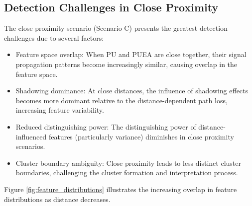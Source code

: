 \subsection{Detection Challenges in Close Proximity}

The close proximity scenario (Scenario C) presents the greatest detection challenges due to several factors:

\begin{itemize}
    \item Feature space overlap: When PU and PUEA are close together, their signal propagation patterns become increasingly similar, causing overlap in the feature space.
    
    \item Shadowing dominance: At close distances, the influence of shadowing effects becomes more dominant relative to the distance-dependent path loss, increasing feature variability.
    
    \item Reduced distinguishing power: The distinguishing power of distance-influenced features (particularly variance) diminishes in close proximity scenarios.
    
    \item Cluster boundary ambiguity: Close proximity leads to less distinct cluster boundaries, challenging the cluster formation and interpretation process.
\end{itemize}

Figure \ref{fig:feature_distributions} illustrates the increasing overlap in feature distributions as distance decreases.

